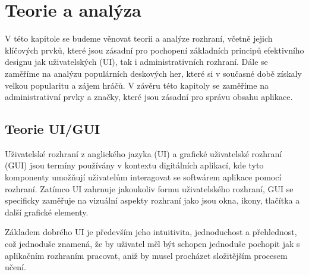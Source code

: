 \chapter{Teorie a analýza}
\label{ch:theory_and_analysis}
V této kapitole se budeme věnovat teorii a analýze rozhraní, včetně jejich klíčových prvků, které jsou zásadní pro pochopení základních principů efektivního designu jak uživatelských (UI), tak i administrativních rozhraní. Dále se zaměříme na analýzu populárních deskových her, které si v současné době získaly velkou popularitu a zájem hráčů. V závěru této kapitoly se zaměříme na administrativní prvky a značky, které jsou zásadní pro správu obsahu aplikace.

\section{Teorie UI/GUI}
\label{sec:ui-gui-theory}
Uživatelské rozhraní z anglického jazyka \textit{} (UI) a grafické uživatelské rozhraní \textit{} (GUI) jsou termíny používány v kontextu digitálních aplikací, kde tyto komponenty umožňují uživatelům interagovat se softwárem aplikace pomocí rozhraní. Zatímco UI zahrnuje jakoukoliv formu uživatelského rozhraní, GUI se specificky zaměřuje na vizuální aspekty rozhraní jako jsou okna, ikony, tlačítka a další grafické elementy.

Základem dobrého UI je především jeho intuitivita, jednoduchost a přehlednost, což jednoduše znamená, že by uživatel měl být schopen jednoduše pochopit jak s aplikačním rozhraním pracovat, aniž by musel procházet složitějším procesem učení.

